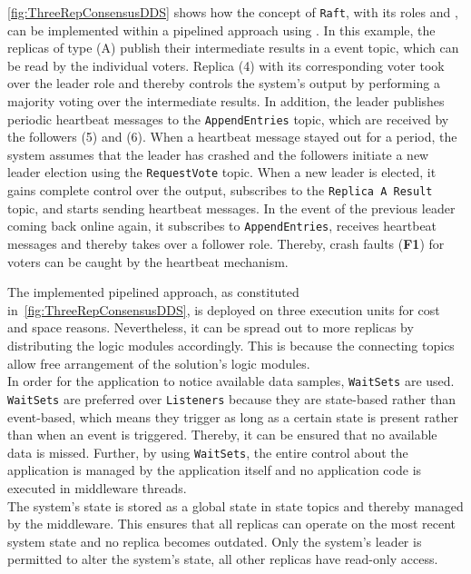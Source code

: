 \autoref{fig:ThreeRepConsensusDDS} shows how the concept of \texttt{Raft}, with its roles and , can be implemented within a pipelined approach using .
In this example, the replicas of type (A) publish their intermediate results in a  event topic, which can be read by the individual voters.
Replica (4) with its corresponding voter took over the leader role and thereby controls the system's output by performing a majority voting over the intermediate results.
In addition, the leader publishes periodic heartbeat messages to the \texttt{AppendEntries} topic, which are received by the followers (5) and (6).
When a heartbeat message stayed out for a period, the system assumes that the leader has crashed and the followers initiate a new leader election using the \texttt{RequestVote} topic.
When a new leader is elected, it gains complete control over the output, subscribes to the \texttt{Replica A Result} topic, and starts sending heartbeat messages.
In the event of the previous leader coming back online again, it subscribes to \texttt{AppendEntries}, receives heartbeat messages and thereby takes over a follower role.
Thereby, crash faults (\textbf{F1}) for voters can be caught by the heartbeat mechanism.

The implemented pipelined approach, as constituted in~\autoref{fig:ThreeRepConsensusDDS}, is deployed on three execution units for cost and space reasons.
Nevertheless, it can be spread out to more replicas by distributing the logic modules accordingly.
This is because the connecting  topics allow free arrangement of the solution's logic modules.
\\

In order for the application to notice available data samples, \texttt{WaitSets} are used.
\texttt{WaitSets} are preferred over \texttt{Listeners} because they are state-based rather than event-based, which means they trigger as long as a certain state is present rather than when an event is triggered.
Thereby, it can be ensured that no available data is missed.
Further, by using \texttt{WaitSets}, the entire control about the application is managed by the application itself and no application code is executed in middleware threads.
\\

The system's state is stored as a global state in  state topics and thereby managed by the middleware.
This ensures that all replicas can operate on the most recent system state and no replica becomes outdated.
Only the system's leader is permitted to alter the system's state, all other replicas have read-only access.
\\

